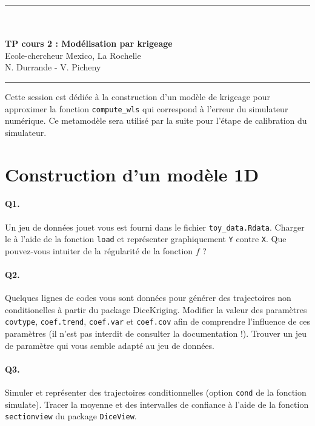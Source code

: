 \documentclass[12pt]{scrartcl}
\begin{document}
\begin{center}
	\rule{\textwidth}{1pt}
	\\ \ \\
	{\LARGE \textbf{TP cours 2 : Modélisation par krigeage}}\\
	\vspace{3mm}
	{\large Ecole-chercheur Mexico, La Rochelle \\ \vspace{3mm}}
	{\normalsize N. Durrande - V. Picheny}\\
	\vspace{3mm}
	\rule{\textwidth}{1pt}
	\vspace{5mm}
\end{center}
Cette session est dédiée à la construction d'un modèle de krigeage pour approximer la fonction  \texttt{compute\_wls} qui correspond à l'erreur du simulateur numérique. Ce metamodèle sera utilisé par la suite pour l'étape de calibration du simulateur.

\section{Construction d'un modèle 1D}

\paragraph{Q1.} Un jeu de données jouet vous est fourni dans le fichier \texttt{toy\_data.Rdata}. Charger le à l'aide de la fonction \texttt{load} et représenter graphiquement \texttt{Y} contre \texttt{X}. Que pouvez-vous intuiter de la régularité de la fonction $f$ ?

\paragraph{Q2.} Quelques lignes de codes vous sont données pour générer des trajectoires non conditionelles à partir du package DiceKriging. Modifier la valeur des paramètres \texttt{covtype}, \texttt{coef.trend}, \texttt{coef.var} et \texttt{coef.cov} afin de comprendre l'influence de ces paramètres (il n'est pas interdit de consulter la documentation !). Trouver un jeu de paramètre qui vous semble adapté au jeu de données.

\paragraph{Q3.} Simuler et représenter des trajectoires conditionnelles (option \texttt{cond} de la fonction simulate). Tracer la moyenne et des intervalles de confiance à l'aide de la fonction \texttt{sectionview} du package \texttt{DiceView}.
\end{document}
